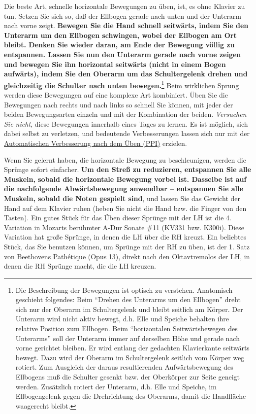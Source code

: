 Die beste Art, schnelle horizontale Bewegungen zu üben, ist, es ohne Klavier zu tun.
Setzen Sie sich so, daß der Ellbogen gerade nach unten und der Unterarm nach vorne zeigt.
\textbf{Bewegen Sie die Hand schnell seitwärts, indem Sie den Unterarm um den Ellbogen schwingen, wobei der Ellbogen am Ort bleibt.
Denken Sie wieder daran, am Ende der Bewegung völlig zu entspannen.
Lassen Sie nun den Unterarm gerade nach vorne zeigen und bewegen Sie ihn horizontal seitwärts (nicht in einem Bogen aufwärts), indem Sie den Oberarm um das Schultergelenk drehen und gleichzeitig die Schulter nach unten bewegen.}\footnote{Die Beschreibung der Bewegungen ist optisch zu verstehen.
Anatomisch geschieht folgendes:
Beim \enquote{Drehen des Unterarms um den Ellbogen} dreht sich nur der Oberarm im Schultergelenk und bleibt seitlich am Körper.
Der Unterarm wird nicht aktiv bewegt, d.h. Elle und Speiche behalten ihre relative Position zum Ellbogen.
Beim \enquote{horizontalen Seitwärtsbewegen des Unterarms} soll der Unterarm immer auf derselben Höhe und gerade nach vorne gerichtet bleiben.
Er wird entlang der gedachten Klavierkante seitwärts bewegt.
Dazu wird der Oberarm im Schultergelenk seitlich vom Körper weg rotiert.
Zum Ausgleich der daraus resultierenden Aufwärtsbewegung des Ellbogens muß die Schulter gesenkt bzw. der Oberkörper zur Seite geneigt werden.
Zusätzlich rotiert der Unterarm, d.h. Elle und Speiche, im Ellbogengelenk gegen die Drehrichtung des Oberarms, damit die Handfläche waagerecht bleibt.}
Beim wirklichen Sprung werden diese Bewegungen auf eine komplexe Art kombiniert.
Üben Sie die Bewegungen nach rechts und nach links so schnell Sie können, mit jeder der beiden Bewegungsarten einzeln und mit der Kombination der beiden.
\textit{Versuchen Sie nicht}, diese Bewegungen innerhalb eines Tages zu lernen.
Es ist möglich, sich dabei selbst zu verletzen, und bedeutende Verbesserungen lassen sich nur mit der \hyperref[c1ii15]{Automatischen Verbesserung nach dem Üben (PPI)} erzielen.

Wenn Sie gelernt haben, die horizontale Bewegung zu beschleunigen, werden die Sprünge sofort einfacher.
\textbf{Um den Streß zu reduzieren, entspannen Sie alle Muskeln, sobald die horizontale Bewegung vorbei ist.
Dasselbe ist auf die nachfolgende Abwärtsbewegung anwendbar -- entspannen Sie alle Muskeln, sobald die Noten gespielt sind}, und lassen Sie das Gewicht der Hand auf dem Klavier ruhen (heben Sie nicht die Hand bzw. die Finger von den Tasten).
Ein gutes Stück für das Üben dieser Sprünge mit der LH ist die 4. Variation in Mozarts berühmter A-Dur Sonate \#11 (KV331 bzw. K300i).
Diese Variation hat große Sprünge, in denen die LH über die RH kreuzt.
Ein beliebtes Stück, das Sie benutzen können, um Sprünge mit der RH zu üben, ist der 1. Satz von Beethovens Pathétique (Opus 13), direkt nach den Oktavtremolos der LH, in denen die RH Sprünge macht, die die LH kreuzen.

